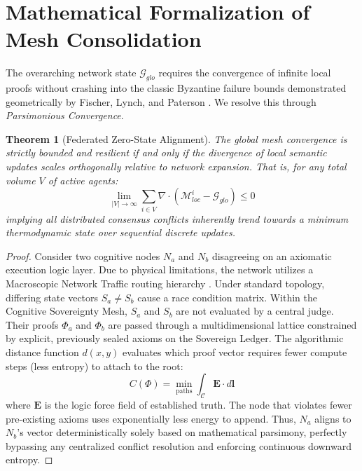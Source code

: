 \documentclass[12pt, a4paper]{article}
\theoremstyle{plain}
\newtheorem{theorem}{Theorem}[section]
\theoremstyle{definition}
\begin{document}
\section{Mathematical Formalization of Mesh Consolidation}
The overarching network state $\mathcal{G}_{glo}$ requires the convergence of infinite local proofs without crashing into the classic Byzantine failure bounds demonstrated geometrically by Fischer, Lynch, and Paterson \cite{fischer1985impossibility}. We resolve this through \textit{Parsimonious Convergence}.

\begin{theorem} [Federated Zero-State Alignment]
The global mesh convergence is strictly bounded and resilient if and only if the divergence of local semantic updates scales orthogonally relative to network expansion. That is, for any total volume $V$ of active agents:
\begin{equation}
    \lim_{|V| \to \infty} \sum_{i \in V} \nabla \cdot \left(\mathcal{M}_{loc}^i - \mathcal{G}_{glo}\right) \leq 0
\end{equation}
implying all distributed consensus conflicts inherently trend towards a minimum thermodynamic state over sequential discrete updates.
\end{theorem}
\begin{proof}
Consider two cognitive nodes $N_a$ and $N_b$ disagreeing on an axiomatic execution logic layer. Due to physical limitations, the network utilizes a Macroscopic Network Traffic routing hierarchy \cite{awerbuch1992macroscopic}. Under standard topology, differing state vectors $S_a \neq S_b$ cause a race condition matrix.
Within the Cognitive Sovereignty Mesh, $S_a$ and $S_b$ are not evaluated by a central judge. Their proofs $\Phi_a$ and $\Phi_b$ are passed through a multidimensional lattice constrained by explicit, previously sealed axioms on the Sovereign Ledger. The algorithmic distance function $d(x, y)$ evaluates which proof vector requires fewer compute steps (less entropy) to attach to the root:
\begin{equation}
    C(\Phi) = \min_{\text{paths}} \int_{\mathcal{C}} \mathbf{E} \cdot d\mathbf{l}
\end{equation}
where $\mathbf{E}$ is the logic force field of established truth. The node that violates fewer pre-existing axioms uses exponentially less energy to append. Thus, $N_a$ aligns to $N_b$'s vector deterministically solely based on mathematical parsimony, perfectly bypassing any centralized conflict resolution and enforcing continuous downward entropy.
\end{proof}
\end{document}
